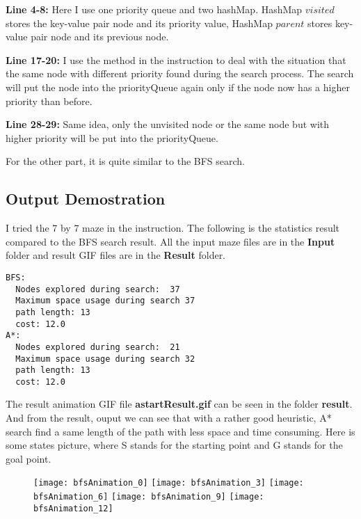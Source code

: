 \documentclass{article}
\begin{document}
\begin{flushleft}
\textbf{Line 4-8:} Here I use one priority queue and two hashMap. HashMap $visited$ stores the key-value pair node and its priority value, HashMap $parent$ stores key-value pair node and its previous node.

\textbf{Line 17-20:} I use the method in the instruction to deal with the situation that the same node with different priority found during the search process. The search will put the node into the priorityQueue again only if the node now has a higher priority than before.

\textbf{Line 28-29:} Same idea, only the unvisited node or the same node but with higher priority will be put into the priorityQueue.

For the other part, it is quite similar to the BFS search.
\end{flushleft}

\subsection{Output Demostration}
I tried the 7 by 7 maze in the instruction. The following is the statistics result compared to the BFS search result. All the input maze files are in the \textbf{Input} folder and result GIF files are in the \textbf{Result} folder. 

\begin{lstlisting}
BFS:  
  Nodes explored during search:  37
  Maximum space usage during search 37
  path length: 13
  cost: 12.0
A*:  
  Nodes explored during search:  21
  Maximum space usage during search 32
  path length: 13
  cost: 12.0
\end{lstlisting}

\begin{flushleft}
The result animation GIF file \textbf{astartResult.gif} can be seen in the folder \textbf{result}. And from the result, ouput we can see that with a rather good heuristic, A* search find a same length of the path with less space and time consuming. Here is some states picture, where S stands for the starting point and G stands for the goal point.
\end{flushleft}

\begin{figure}[!htb]

  \texttt{[image: bfsAnimation\_0]}
\endminipage\hfill
{}
  \texttt{[image: bfsAnimation\_3]}
\endminipage\hfill
{}
  \texttt{[image: bfsAnimation\_6]}
\endminipage
{}
  \texttt{[image: bfsAnimation\_9]}
\endminipage
{}
  \texttt{[image: bfsAnimation\_12]}
\endminipage
\end{figure}
\end{document}
